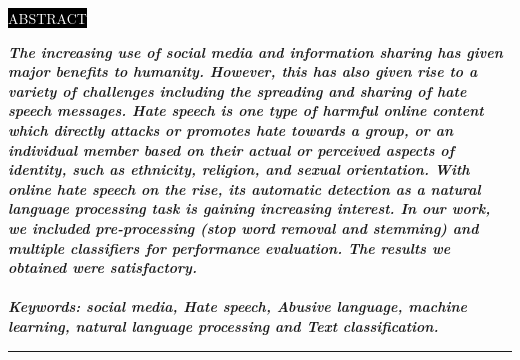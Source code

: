 \documentclass{letter}
\begin{document}
\colorbox{black}{\textcolor{white}{ABSTRACT}}\\
\begin{footnotesize}
\textbf{\textit {The increasing use of social media and information sharing has given major benefits to humanity. However, this has also given 
rise to a variety of challenges including the spreading and sharing of hate speech messages. Hate speech is one type of harmful 
online content which directly attacks or promotes hate towards a group, or an individual member based on their actual or 
perceived aspects of identity, such as ethnicity, religion, and sexual orientation. With online hate speech on the rise, its automatic 
detection as a natural language processing task is gaining increasing interest. In our work, we included pre-processing (stop word 
removal and stemming) and multiple classifiers for performance evaluation. The results we obtained were satisfactory.\\  \\
Keywords: social media, Hate speech, Abusive language, machine learning, natural language processing and Text classification.}}
\end{footnotesize}
\noindent\rule{7in}{2pt}
\end{document}
